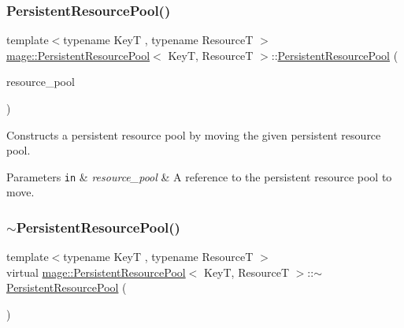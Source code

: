 \subsubsection{\texorpdfstring{Persistent\+Resource\+Pool()}{PersistentResourcePool()}\hspace{0.1cm}{\footnotesize\ttfamily [3/3]}}
{\footnotesize\ttfamily template$<$typename KeyT , typename ResourceT $>$ \\
\hyperlink{classmage_1_1_persistent_resource_pool}{mage\+::\+Persistent\+Resource\+Pool}$<$ KeyT, ResourceT $>$\+::\hyperlink{classmage_1_1_persistent_resource_pool}{Persistent\+Resource\+Pool} (\begin{DoxyParamCaption}\item[{\hyperlink{classmage_1_1_persistent_resource_pool}{Persistent\+Resource\+Pool}$<$ KeyT, ResourceT $>$ \&\&}]{resource\+\_\+pool }\end{DoxyParamCaption})}

Constructs a persistent resource pool by moving the given persistent resource pool.


\begin{DoxyParams}[1]{Parameters}
\mbox{\tt in}  & {\em resource\+\_\+pool} & A reference to the persistent resource pool to move. \\
\hline
\end{DoxyParams}
\hypertarget{classmage_1_1_persistent_resource_pool_a3408c2feb02a1d3b13c16d889fc50709}{}\label{classmage_1_1_persistent_resource_pool_a3408c2feb02a1d3b13c16d889fc50709} 
\subsubsection{\texorpdfstring{$\sim$\+Persistent\+Resource\+Pool()}{~PersistentResourcePool()}}
{\footnotesize\ttfamily template$<$typename KeyT , typename ResourceT $>$ \\
virtual \hyperlink{classmage_1_1_persistent_resource_pool}{mage\+::\+Persistent\+Resource\+Pool}$<$ KeyT, ResourceT $>$\+::$\sim$\hyperlink{classmage_1_1_persistent_resource_pool}{Persistent\+Resource\+Pool} (\begin{DoxyParamCaption}{ }\end{DoxyParamCaption})\hspace{0.3cm}{\ttfamily [virtual]}}

